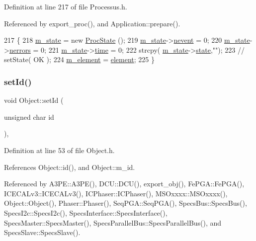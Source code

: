 Definition at line 217 of file Processus.\+h.



Referenced by export\+\_\+proc(), and Application\+::prepare().


\begin{DoxyCode}
217                                      \{
218     \hyperlink{classProcessus_ab3539eee42891ceae0baf4395ae7fb61}{m\_state} = \textcolor{keyword}{new} \hyperlink{structProcState}{ProcState} ();
219     \hyperlink{classProcessus_ab3539eee42891ceae0baf4395ae7fb61}{m\_state}->\hyperlink{structProcState_a1881d6b0db849a8af15f586ad5959260}{nevent}  = 0;
220     \hyperlink{classProcessus_ab3539eee42891ceae0baf4395ae7fb61}{m\_state}->\hyperlink{structProcState_a51a0f54ba62b07e07ac8518c5f32828d}{nerrors} = 0;
221     \hyperlink{classProcessus_ab3539eee42891ceae0baf4395ae7fb61}{m\_state}->\hyperlink{structProcState_a88c69b099d8f2b2164d478f28e87610f}{time}    = 0;
222     strcpy( \hyperlink{classProcessus_ab3539eee42891ceae0baf4395ae7fb61}{m\_state}->\hyperlink{structProcState_aaffb70e5af437e2c0d4dfc69bd0b24cd}{state},\textcolor{stringliteral}{""});
223     \textcolor{comment}{//  setState( OK );}
224     \hyperlink{classProcessus_aa9d24d53c3e52f36786cabb5d8e296e7}{m\_element} = \hyperlink{classProcessus_a6fe155527431a7190b7d44d600b9608d}{element};
225   \}
\end{DoxyCode}
\mbox{\label{classObject_a398fe08cba594a0ce6891d59fe4f159f}} 
\subsubsection{\texorpdfstring{set\+Id()}{setId()}}
{\footnotesize\ttfamily void Object\+::set\+Id (\begin{DoxyParamCaption}\item[{unsigned char}]{id }\end{DoxyParamCaption})\hspace{0.3cm}{\ttfamily [inline]}, {\ttfamily [inherited]}}



Definition at line 53 of file Object.\+h.



References Object\+::id(), and Object\+::m\+\_\+id.



Referenced by A3\+P\+E\+::\+A3\+P\+E(), D\+C\+U\+::\+D\+C\+U(), export\+\_\+obj(), Fe\+P\+G\+A\+::\+Fe\+P\+G\+A(), I\+C\+E\+C\+A\+Lv3\+::\+I\+C\+E\+C\+A\+Lv3(), I\+C\+Phaser\+::\+I\+C\+Phaser(), M\+S\+Oxxxx\+::\+M\+S\+Oxxxx(), Object\+::\+Object(), Phaser\+::\+Phaser(), Seq\+P\+G\+A\+::\+Seq\+P\+G\+A(), Specs\+Bus\+::\+Specs\+Bus(), Specs\+I2c\+::\+Specs\+I2c(), Specs\+Interface\+::\+Specs\+Interface(), Specs\+Master\+::\+Specs\+Master(), Specs\+Parallel\+Bus\+::\+Specs\+Parallel\+Bus(), and Specs\+Slave\+::\+Specs\+Slave().


